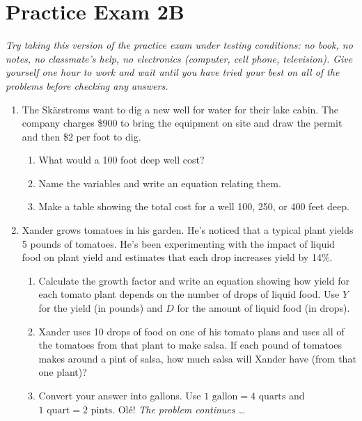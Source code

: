 
\section*{Practice Exam 2B}  

\emph{Try taking this version of the practice exam under testing conditions:  no book, no notes, no classmate's help, no electronics (computer, cell phone, television). Give yourself one hour to work and wait until you have tried your best on all of the problems before checking any answers.}

\noindent \hrulefill

\begin{enumerate}

 \item The Sk\"arstroms want to dig a new well for water for their lake cabin.  The company charges \$900 to bring the equipment on site and draw the permit and then \$2 per foot to dig.
\begin{enumerate}
\item What would a 100 foot deep well cost? \vfill 
\item Name the variables and write an equation relating them. \vfill \vfill \vfill 
\item Make a table showing the total cost for a well 100, 250, or 400 feet deep. \vfill \vfill 
\end{enumerate} %

\newpage %

\item Xander grows tomatoes in his garden.  He's noticed that a typical plant yields 5 pounds of tomatoes.  He's been experimenting with the impact of liquid food on plant yield and estimates that each drop increases yield by 14\%.
\begin{enumerate}
\item Calculate the growth factor and write an equation showing how yield for each tomato plant depends on the number of drops of liquid food.  Use $Y$ for the yield (in pounds) and $D$ for the amount of liquid food (in drops).  \vfill  

\item Xander uses 10 drops of food on one of his tomato plans and uses all of the tomatoes from that plant to make salsa.  If each pound of tomatoes makes around a pint of salsa, how much salsa will Xander have (from that one plant)? \vfill 
\item Convert your answer into gallons.  Use $1 \text{ gallon} = 4 \text{ quarts}$ and $1 \text{ quart} = 2 \text{ pints}.$  Ol\'e! \vfill 
\newpage
\hspace{-.5in}  \emph{The problem continues \ldots}


\end{enumerate}
\end{enumerate}
